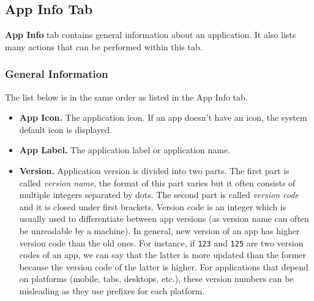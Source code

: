 \subsection{App Info Tab}\label{subsec:app-info-tab} %
\textbf{App Info} tab contains general information about an application. It also lists many actions that can be
performed within this tab.

\subsubsection{General Information}\label{subsubsec:app-info-general-information} %
The list below is in the same order as listed in the App Info tab.
\begin{itemize}
    \item \textbf{App Icon.} The application icon. If an app doesn't have an icon, the system default icon is displayed.

    \item \textbf{App Label.} The application label or application name.

    \item \textbf{Version.} Application version is divided into two parts. The first part is called \textit{version
    name}, the format of this part varies but it often consists of multiple integers separated by dots. The second part
    is called \textit{version code} and it is closed under first brackets. Version code is an integer which is usually
    used to differentiate between app versions (as version name can often be unreadable by a machine). In general, new
    version of an app has higher version code than the old ones. For instance, if \texttt{123} and \texttt{125} are two
    version codes of an app, we can say that the latter is more updated than the former because the version code of the
    latter is higher. For applications that depend on platforms (mobile, tabs, desktops, etc.), these version numbers
    can be misleading as they use prefixes for each platform.


\end{itemize}
